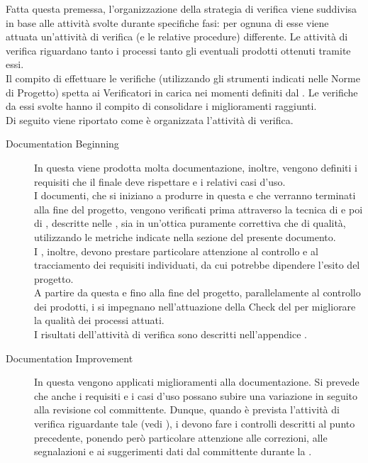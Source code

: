 		Fatta questa premessa, l'organizzazione della strategia di verifica viene suddivisa in base alle attività svolte durante specifiche fasi: per ognuna 
		di esse viene attuata un'attività di verifica (e le relative procedure) differente. Le attività di verifica riguardano tanto i processi tanto gli 
		eventuali prodotti ottenuti tramite essi.\\
		Il compito di effettuare le verifiche (utilizzando gli strumenti indicati nelle Norme di Progetto) spetta ai Verificatori in carica nei momenti 
		definiti dal . Le verifiche da essi svolte hanno il compito di consolidare i miglioramenti raggiunti.\\
		Di seguito viene riportato come è organizzata l'attività di verifica.
		\begin{description}
			\item[ Documentation Beginning] In questa  viene prodotta molta documentazione, inoltre, vengono definiti i requisiti che il  finale deve rispettare e i relativi casi d'uso. \\
		I documenti, che si iniziano a produrre in questa  e che verranno terminati alla fine del progetto, vengono verificati prima attraverso la tecnica di  e poi di , descritte nelle , sia in un'ottica puramente correttiva che di qualità, utilizzando le metriche indicate nella sezione  del presente documento. \\
		I , inoltre, devono prestare particolare attenzione al controllo e al tracciamento dei requisiti individuati, da cui potrebbe dipendere l'esito del progetto.\\
		A partire da questa  e fino alla fine del progetto, parallelamente al controllo dei prodotti, i  si impegnano nell'attuazione della  Check del  per migliorare la qualità dei processi attuati. \\
		I risultati dell'attività di verifica sono descritti nell'appendice .
		\item[ Documentation Improvement] In questa  vengono applicati miglioramenti alla documentazione. Si prevede che anche i requisiti e i casi d'uso 
		possano subire una variazione in seguito alla revisione col committente. Dunque, quando è prevista l'attività di verifica riguardante tale  (vedi ), i  devono fare i controlli descritti al punto precedente, ponendo però particolare attenzione alle correzioni, alle segnalazioni e ai suggerimenti dati dal committente durante la .\\

\end{description}
